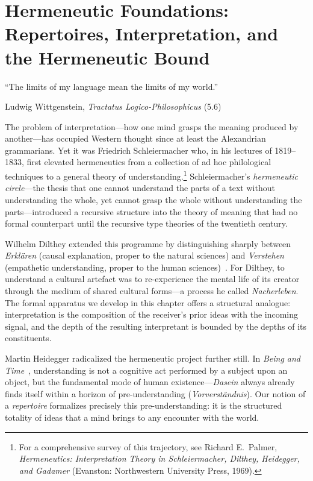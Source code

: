 
\chapter{Hermeneutic Foundations: Repertoires, Interpretation, and the Hermeneutic Bound}
\label{ch:hermeneutic}

\epigraph{``The limits of my language mean the limits of my world.''}{Ludwig Wittgenstein, \textit{Tractatus Logico-Philosophicus} (5.6)}


The problem of interpretation---how one mind grasps the meaning
produced by another---has occupied Western thought since at least the
Alexandrian grammarians.  Yet it was Friedrich Schleiermacher who, in his
lectures of 1819--1833, first elevated hermeneutics from a collection of
ad hoc philological techniques to a general theory of
understanding.\footnote{For a comprehensive survey of this trajectory,
see Richard E.\ Palmer, \emph{Hermeneutics: Interpretation Theory in
Schleiermacher, Dilthey, Heidegger, and Gadamer} (Evanston: Northwestern
University Press, 1969).}  Schleiermacher's \emph{hermeneutic circle}---the
thesis that one cannot understand the parts of a text without
understanding the whole, yet cannot grasp the whole without
understanding the parts---introduced a recursive structure into the
theory of meaning that had no formal counterpart until the recursive
type theories of the twentieth century.

Wilhelm Dilthey extended this programme by distinguishing sharply
between \emph{Erkl\"aren} (causal explanation, proper to the natural
sciences) and \emph{Verstehen} (empathetic understanding, proper to the
human sciences)~\cite{dilthey1883}.  For Dilthey, to understand a
cultural artefact was to re-experience the mental life of its creator
through the medium of shared cultural forms---a process he called
\emph{Nacherleben}.  The formal apparatus we develop in this chapter
offers a structural analogue: interpretation is the composition of the
receiver's prior ideas with the incoming signal, and the depth of the
resulting interpretant is bounded by the depths of its constituents.

Martin Heidegger radicalized the hermeneutic project further still.  In
\emph{Being and Time}~\cite{heidegger1927}, understanding is not a
cognitive act performed by a subject upon an object, but the fundamental
mode of human existence---\emph{Dasein} always already finds itself
within a horizon of pre-understanding (\emph{Vorverst\"andnis}).  Our
notion of a \emph{repertoire} formalizes precisely this pre-understanding:
it is the structured totality of ideas that a mind brings to any
encounter with the world.

